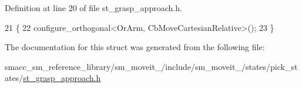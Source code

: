 Definition at line 20 of file st\+\_\+grasp\+\_\+approach.\+h.


\begin{DoxyCode}
21     \{ 
22         configure\_orthogonal<OrArm, CbMoveCartesianRelative>();
23     \}
\end{DoxyCode}


The documentation for this struct was generated from the following file\+:\begin{DoxyCompactItemize}
\item 
smacc\+\_\+sm\+\_\+reference\+\_\+library/sm\+\_\+moveit\+\_/include/sm\+\_\+moveit\+\_/states/pick\+\_\+states/\hyperlink{3_2include_2sm__moveit__3_2states_2pick__states_2st__grasp__approach_8h}{st\+\_\+grasp\+\_\+approach.\+h}\end{DoxyCompactItemize}
